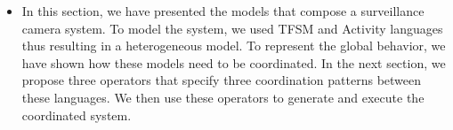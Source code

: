 \begin{itemize}
	\item In this section, we have presented the models that compose a surveillance camera system. To model the system, we used TFSM and Activity languages thus resulting in a heterogeneous model. To represent the global behavior, we have shown how these models need to be coordinated. In the next section, we propose three \bcool operators that specify three coordination patterns between these languages. We then use these operators to generate and execute the coordinated system. 
	
	
	
\end{itemize}





